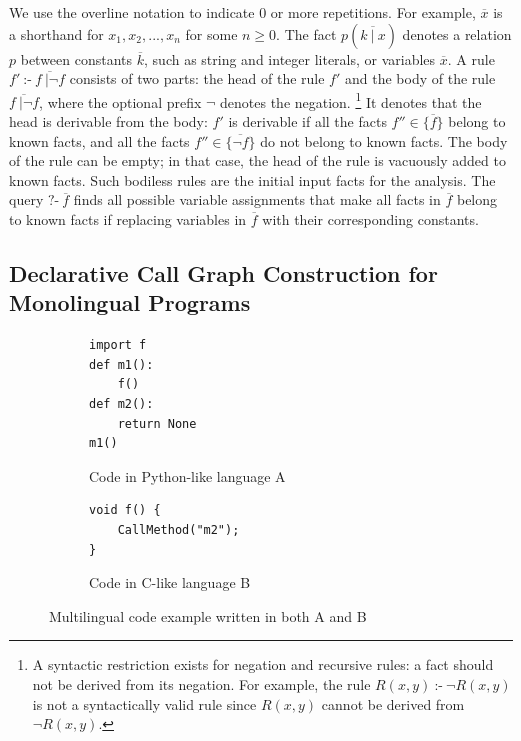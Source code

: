 \noindent
We use the overline notation to indicate 0 or more repetitions.  For example,
$\overline{x}$ is a shorthand for $x_1, x_2, ..., x_n$ for some $n \ge 0$.  The
fact $p(\overline{k\ |\ x})$ denotes a relation $p$ between constants
$\overline{k}$, such as string and integer literals, or variables
$\overline{x}$.  A rule $f'\ \mbox{:-}\ \overline{f\ |\neg f}$ consists of two
parts: the head of the rule $f'$ and the body of the rule $\overline{f\ |\neg
f}$, where the optional prefix $\neg$ denotes the negation.  \footnote{A
syntactic restriction exists for negation and recursive rules: a fact should
not be derived from its negation. For example, the rule $R(x, y)\ \mbox{:-}\
\neg R(x, y)$ is not a syntactically valid rule since $R(x, y)$ cannot be
derived from $\neg R(x, y)$.} It denotes that the head is derivable from the
body: $f'$ is derivable if all the facts $f'' \in \{\overline{f}\}$ belong to
known facts, and all the facts $f'' \in \{\overline{\neg f}\}$ do not belong to
known facts.  The body of the rule can be empty; in that case, the head of the
rule is vacuously added to known facts.  Such bodiless rules are the initial
input facts for the analysis.  The query $\mbox{?-}\ \overline{f}$ finds all
possible variable assignments that make all facts in $\overline{f}$ belong to
known facts if replacing variables in $\overline{f}$ with their corresponding
constants.


\subsection{Declarative Call Graph Construction for Monolingual Programs}\label{lab:ovmono}
\begin{figure}[t]
  \centering
  \begin{subfigure}[t]{0.45\textwidth}
    \begin{lstlisting}[style=mpython]
import f
def m1():
    f()
def m2():
    return None
m1()
    \end{lstlisting}
    \vspace*{-.5em}
    \caption{Code in Python-like language A}
    \label{fig:exam:langA}
  \end{subfigure}
  \begin{subfigure}[t]{0.45\textwidth}
    \begin{lstlisting}[style=mcpp,firstnumber=7]
void f() {
    CallMethod("m2");
}
    \end{lstlisting}
    \vspace*{3.5em}
    \caption{Code in C-like language B}
    \label{fig:exam:langB}
  \end{subfigure}
  \vspace*{-.5em}
  \caption{Multilingual code example written in both A and B}
  \label{fig:exam}
\end{figure}

